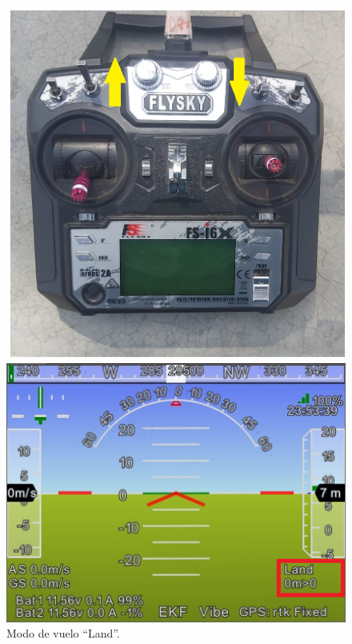 	\begin{figure}[H]
	\centering
	\begin{minipage}[b]{0.4\textwidth}
		\centering
		\includegraphics[width=\textwidth]{imagenes/ctr6}
	\end{minipage}
	\hspace{0.05\textwidth} %
	\begin{minipage}[b]{0.5\textwidth}
		\centering
		\includegraphics[width=1.1\textwidth]{imagenes/mp4}
	\end{minipage}
	\caption{Modo de vuelo “Land”.}
	\label{fig:modo_stabilize}
\end{figure}

